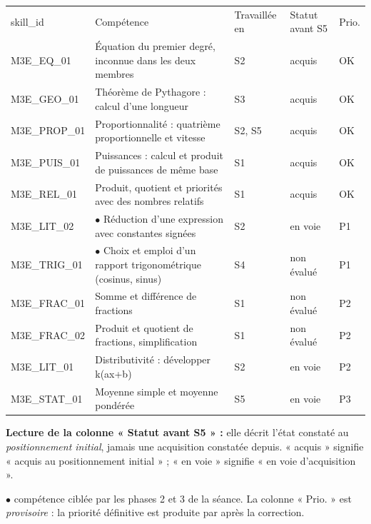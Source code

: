 \documentclass[10pt,a4paper]{article}
\begin{document}
\newpage{}
\par\noindent\begin{tabularx}{\linewidth}{>{\ttfamily\scriptsize}p{27mm} X >{\scriptsize}p{16mm} >{\scriptsize}p{20mm} >{\scriptsize\centering\arraybackslash}p{9mm}}
\rowcolor{Navy}\color{white}\scriptsize skill\_id & \color{white}Compétence & \color{white}Travaillée en & \color{white}Statut avant S5 & \color{white}Prio. \\
M3E\_EQ\_01 & Équation du premier degré, inconnue dans les deux membres & S2 & acquis & OK \\
M3E\_GEO\_01 & Théorème de Pythagore : calcul d'une longueur & S3 & acquis & OK \\
M3E\_PROP\_01 & Proportionnalité : quatrième proportionnelle et vitesse & S2, S5 & acquis & OK \\
M3E\_PUIS\_01 & Puissances : calcul et produit de puissances de même base & S1 & acquis & OK \\
M3E\_REL\_01 & Produit, quotient et priorités avec des nombres relatifs & S1 & acquis & OK \\
M3E\_LIT\_02 & $\bullet$ Réduction d'une expression avec constantes signées & S2 & en voie & P1 \\
M3E\_TRIG\_01 & $\bullet$ Choix et emploi d'un rapport trigonométrique (cosinus, sinus) & S4 & non évalué & P1 \\
M3E\_FRAC\_01 & Somme et différence de fractions & S1 & non évalué & P2 \\
M3E\_FRAC\_02 & Produit et quotient de fractions, simplification & S1 & non évalué & P2 \\
M3E\_LIT\_01 & Distributivité : développer k(ax+b) & S2 & en voie & P2 \\
M3E\_STAT\_01 & Moyenne simple et moyenne pondérée & S5 & en voie & P3 \\
\end{tabularx}
\par\vspace{1mm}\small\textbf{Lecture de la colonne « Statut avant S5 » :} elle décrit l'état constaté au \emph{positionnement initial}, jamais une acquisition constatée depuis. « acquis » signifie « acquis au positionnement initial » ; « en voie » signifie « en voie d'acquisition ».
\par\small$\bullet$ compétence ciblée par les phases 2 et 3 de la séance. La colonne « Prio. » est \emph{provisoire} : la priorité définitive est produite par  après la correction.
\end{document}
